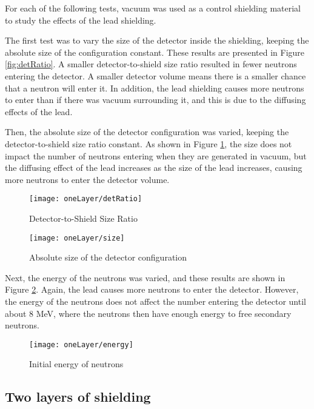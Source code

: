 \documentclass[12pt]{article}
\begin{document}
For each of the following tests, vacuum was used as a control shielding material to study the effects of the lead shielding.

The first test was to vary the size of the detector inside the shielding, keeping the absolute size of the configuration constant. These results are presented in Figure \ref{fig:detRatio}. A smaller detector-to-shield size ratio resulted in fewer neutrons entering the detector. A smaller detector volume means there is a smaller chance that a neutron will enter it. In addition, the lead shielding causes more neutrons to enter than if there was vacuum surrounding it, and this is due to the diffusing effects of the lead.

Then, the absolute size of the detector configuration was varied, keeping the detector-to-shield size ratio constant. As shown in Figure \ref{fig:size}, the size does not impact the number of neutrons entering when they are generated in vacuum, but the diffusing effect of the lead increases as the size of the lead increases, causing more neutrons to enter the detector volume.

\begin{figure}[H]
  \centering
  \begin{minipage}[t]{0.45\linewidth}
    \texttt{[image: oneLayer/detRatio]}
    \caption{Detector-to-Shield Size Ratio}
    \label{fig:detRatio}
  \end{minipage}
  \quad
  \begin{minipage}[t]{0.45\linewidth}
    \texttt{[image: oneLayer/size]}
    \caption{Absolute size of the detector configuration}
    \label{fig:size}
  \end{minipage}
\end{figure}

Next, the energy of the neutrons was varied, and these results are shown in Figure \ref{fig:energy}. Again, the lead causes more neutrons to enter the detector. However, the energy of the neutrons does not affect the number entering the detector until about 8 MeV, where the neutrons then have enough energy to free secondary neutrons.

\begin{figure}[H]
 \centering
 \texttt{[image: oneLayer/energy]}
 \caption{Initial energy of neutrons}
 \label{fig:energy}
\end{figure}

\subsection{Two layers of shielding}
\end{document}
